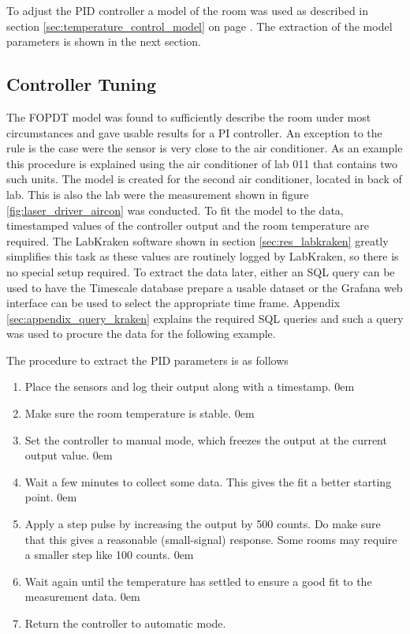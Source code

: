 To adjust the PID controller a model of the room was used as described in section \ref{sec:temperature_control_model} on page \pageref{sec:temperature_control_model}. The extraction of the model parameters is shown in the next section.

\subsection{Controller Tuning}%
\label{sec:pid_controller_tuning}
The FOPDT model was found to sufficiently describe the room under most circumstances and gave usable results for a PI controller. An exception to the rule is the case were the sensor is very close to the air conditioner. As an example this procedure is explained using the air conditioner of lab 011 that contains two such units. The model is created for the second air conditioner, located in back of lab. This is also the lab were the measurement shown in figure \ref{fig:laser_driver_aircon} was conducted. To fit the model to the data, timestamped values of the controller output and the room temperature are required. The LabKraken software shown in section \ref{sec:res_labkraken} greatly simplifies this task as these values are routinely logged by LabKraken, so there is no special setup required. To extract the data later, either an SQL query can be used to have the Timescale database prepare a usable dataset or the Grafana web interface can be used to select the appropriate time frame. Appendix \ref{sec:appendix_query_kraken} explains the required SQL queries and such a query was used to procure the data for the following example.

The procedure to extract the PID parameters is as follows
\begin{enumerate}
    \itemsep0em
    \item Place the sensors and log their output along with a timestamp.
    \itemsep0em
    \item Make sure the room temperature is stable.
    \itemsep0em
    \item Set the controller to manual mode, which freezes the output at the current output value.
    \itemsep0em
    \item Wait a few minutes to collect some data. This gives the fit a better starting point.
    \itemsep0em
    \item Apply a step pulse by increasing the output by 500 counts. Do make sure that this gives a reasonable (small-signal) response. Some rooms may require a smaller step like 100 counts.
    \itemsep0em
    \item Wait again until the temperature has settled to ensure a good fit to the measurement data.
    \itemsep0em
    \item Return the controller to automatic mode.
\end{enumerate}

